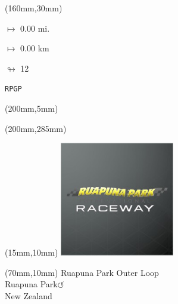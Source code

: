 \begin{textblock*}{40mm}(160mm,30mm)%
\Large
\par$\mapsto$ 0.00 mi.
\par$\mapsto$ 0.00 km
\par$\looparrowright$ 12
\par\hfill\tiny\tt RPGP\\
\end{textblock*}
\begin{textblock*}{20mm}(200mm,5mm)%
\fbox{\thepage}
\label{RPGP}
\end{textblock*}
\begin{textblock*}{20mm}(200mm,285mm)%
\fbox{\thepage}
\end{textblock*}

\null\newpage
\begin{textblock*}{50mm}(15mm,10mm)%
\includegraphics[width=50mm]{LG/RUPU.png}
\end{textblock*}
\begin{textblock*}{130mm}(70mm,10mm)%
{\fontsize{20}{20}\selectfont Ruapuna Park Outer Loop\\}
{\fontsize{16}{16}\selectfont Ruapuna Park\hfill \huge$\circlearrowleft$\\}
{\fontsize{12}{12}\selectfont New Zealand\\}
\end{textblock*}

